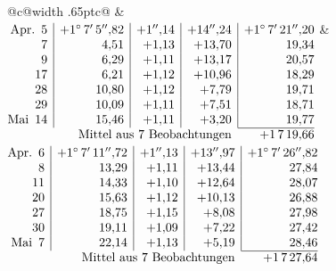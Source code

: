 \noindent\begin{tabular}{@{}c@{\hspace{.4em}\vrule width .65pt\hspace{.4em}}c@{}}
 &
 \\[.18ex]
\(\begin{array}[t]{@{}r|r|r|r|r@{}}
\text{Apr.}\enspace 5 & +1^\circ\,7'\,5''{,}82 & +1''{,}14 & +14''{,}24 & +1^\circ\,7'\,21''{,}20\\
7 & 4{,}51 & +1{,}13 & +13{,}70 & 19{,}34\\
9 & 6{,}29 & +1{,}11 & +13{,}17 & 20{,}57\\
17 & 6{,}21 & +1{,}12 & +10{,}96 & 18{,}29\\
28 & 10{,}80 & +1{,}12 & +7{,}79 & 19{,}71\\
29 & 10{,}09 & +1{,}11 & +7{,}51 & 18{,}71\\
\text{Mai}\enspace 14 & 15{,}46 & +1{,}11 & +3{,}20 & 19{,}77\\
\cline{5-5}
\multicolumn{4}{r}{\text{Mittel aus 7 Beobachtungen}} & +1\,7\,19{,}66
\end{array}\)
&
\(\begin{array}[t]{@{}r|r|r|r|r@{}}
\text{Apr.}\enspace 6 & +1^\circ\,7'\,11''{,}72 & +1''{,}13 & +13''{,}97 & +1^\circ\,7'\,26''{,}82\\
8 & 13{,}29 & +1{,}11 & +13{,}44 & 27{,}84\\
11 & 14{,}33 & +1{,}10 & +12{,}64 & 28{,}07\\
20 & 15{,}63 & +1{,}12 & +10{,}13 & 26{,}88\\
27 & 18{,}75 & +1{,}15 & +8{,}08 & 27{,}98\\
30 & 19{,}11 & +1{,}09 & +7{,}22 & 27{,}42\\
\text{Mai}\enspace 7 & 22{,}14 & +1{,}13 & +5{,}19 & 28{,}46\\
\cline{5-5}
\multicolumn{4}{r}{\text{Mittel aus 7 Beobachtungen}} & +1\,7\,27{,}64
\end{array}\)
\end{tabular}\par\medskip
